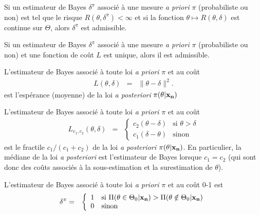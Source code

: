 \documentclass[10pt]{article}
\begin{document}
 
\fi

\if{}
\begin{theorem}
Si un estimateur de Bayes $\delta^{\pi}$ associé à une mesure {\it a priori} $\pi$ (probabiliste ou non) est tel que le risque $R(\theta,\delta^{\pi})<\infty$ et si la fonction $\theta\mapsto R(\theta,\delta)$ est continue sur $\Theta$, alors $\delta^{\pi}$ est admissible.
\end{theorem}


 
\fi

\if{}
\begin{theorem}
Si un estimateur de Bayes $\delta^{\pi}$ associé à une mesure {\it a priori} $\pi$ (probabiliste ou non) et une fonction de coût $L$ est unique, alors il est admissible.
\end{theorem}

 
\fi

\if{}
\begin{proposition}\label{prop1}
L'estimateur de Bayes associé à toute loi {\it a priori} $\pi$ et au co\^ut 
\begin{eqnarray}
L(\theta,\delta) & = & \|\theta-\delta\|^2. \label{cout.quad}
\end{eqnarray}
est l'espérance (moyenne) de la loi {\it a posteriori} $\pi(\theta|{\bf x_n})$
\end{proposition}
 
\fi

\if{}
\begin{proposition}\label{prop2}
L'estimateur de Bayes associé à toute loi {\it a priori} $\pi$ et au co\^ut  
\begin{eqnarray}
L_{c_1,c_2}(\theta,\delta) & = & \left\{\begin{array}{ll} c_2(\theta-\delta) & \text{si $\theta>\delta$} \\ c_1(\delta-\theta) & \text{sinon} 
\end{array} \right. \label{cout.lin}
\end{eqnarray}
est le fractile $c_1/(c_1+c_2)$ de la loi {\it a posteriori} $\pi(\theta|{\bf x_n})$. En particulier, la médiane de la loi {\it a posteriori} est l'estimateur de Bayes lorsque $c_1=c_2$ (qui sont donc des co\^uts associés à la sous-estimation et la surestimation de $\theta$).
\end{proposition}
 
\fi

\begin{proposition}\label{prop3}
L'estimateur de Bayes associé à toute loi {\it a priori} $\pi$ et au co\^ut 0-1 est 
\begin{eqnarray*}
\delta^{\pi} & = & \left\{\begin{array}{ll} 1 & \text{si $\Pi(\theta\in\Theta_0|{\bf x_n}) > \Pi(\theta\notin\Theta_0|{\bf x_n})$} \\ 0 & \text{sinon} \end{array}\right. \label{cout01}
\end{eqnarray*}
\end{proposition}
\if{} 
\fi
\end{document}
